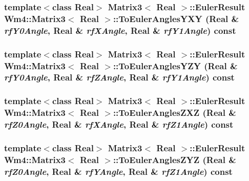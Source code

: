 \subsubsection{\setlength{\rightskip}{0pt plus 5cm}template$<$class Real$>$ {\bf Matrix3}$<$ Real $>$::{\bf Euler\-Result} {\bf Wm4::Matrix3}$<$ Real $>$::To\-Euler\-Angles\-YXY (Real \& {\em rf\-Y0Angle}, Real \& {\em rf\-XAngle}, Real \& {\em rf\-Y1Angle}) const}\label{classWm4_1_1Matrix3_76ae9aa382ee2ce5cea9e9a15a6e3304}


\subsubsection{\setlength{\rightskip}{0pt plus 5cm}template$<$class Real$>$ {\bf Matrix3}$<$ Real $>$::{\bf Euler\-Result} {\bf Wm4::Matrix3}$<$ Real $>$::To\-Euler\-Angles\-YZY (Real \& {\em rf\-Y0Angle}, Real \& {\em rf\-ZAngle}, Real \& {\em rf\-Y1Angle}) const}\label{classWm4_1_1Matrix3_6939f1e3663daa23231c29eb65ff9bd2}


\subsubsection{\setlength{\rightskip}{0pt plus 5cm}template$<$class Real$>$ {\bf Matrix3}$<$ Real $>$::{\bf Euler\-Result} {\bf Wm4::Matrix3}$<$ Real $>$::To\-Euler\-Angles\-ZXZ (Real \& {\em rf\-Z0Angle}, Real \& {\em rf\-XAngle}, Real \& {\em rf\-Z1Angle}) const}\label{classWm4_1_1Matrix3_4c72fd7be1c389039131f4e34001552c}


\subsubsection{\setlength{\rightskip}{0pt plus 5cm}template$<$class Real$>$ {\bf Matrix3}$<$ Real $>$::{\bf Euler\-Result} {\bf Wm4::Matrix3}$<$ Real $>$::To\-Euler\-Angles\-ZYZ (Real \& {\em rf\-Z0Angle}, Real \& {\em rf\-YAngle}, Real \& {\em rf\-Z1Angle}) const}\label{classWm4_1_1Matrix3_3ede757007a191b450fdd405e90cf5a0}


